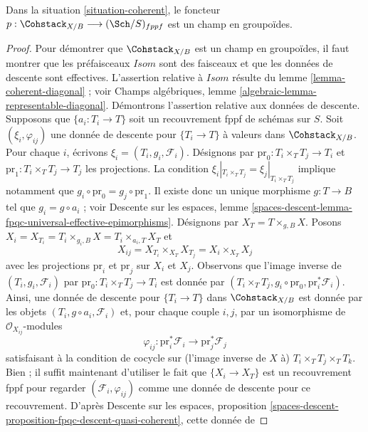 \begin{lemma}
\label{lemma-coherent-stack}
Dans la situation \ref{situation-coherent}, le foncteur
$p : \Cohstack_{X/B} \longrightarrow (\Sch/S)_{fppf}$ est un champ en
groupoïdes.
\end{lemma}

\begin{proof}
Pour démontrer que $\Cohstack_{X/B}$ est un champ en groupoïdes, il faut
montrer que les préfaisceaux $\mathit{Isom}$ sont des faisceaux et que les
données de descente sont effectives. L'assertion relative à $\mathit{Isom}$
résulte du lemme \ref{lemma-coherent-diagonal} ; voir Champs algébriques,
lemme \ref{algebraic-lemma-representable-diagonal}. Démontrons l'assertion
relative aux données de descente. Supposons que
$\{a_i : T_i \to T\}$ soit un recouvrement fppf de schémas sur $S$. Soit
$(\xi_i, \varphi_{ij})$ une donnée de descente pour $\{T_i \to T\}$ à valeurs
dans $\Cohstack_{X/B}$. Pour chaque $i$, écrivons
$\xi_i = (T_i, g_i, \mathcal{F}_i)$. Désignons par
$\text{pr}_0 : T_i \times_T T_j \to T_i$ et
$\text{pr}_1 : T_i \times_T T_j \to T_j$ les projections. La condition
$\xi_i|_{T_i \times_T T_j} = \xi_j|_{T_i \times_T T_j}$ implique notamment
que $g_i \circ \text{pr}_0 = g_j \circ \text{pr}_1$. Il existe donc un unique
morphisme $g : T \to B$ tel que $g_i = g \circ a_i$ ; voir Descente sur les
espaces, lemme
\ref{spaces-descent-lemma-fpqc-universal-effective-epimorphisms}.
Désignons par $X_T = T \times_{g, B} X$. Posons
$X_i = X_{T_i} = T_i \times_{g_i, B} X = T_i \times_{a_i, T} X_T$ et
$$
X_{ij} = X_{T_i} \times_{X_T} X_{T_j} = X_i \times_{X_T} X_j
$$
avec les projections $\text{pr}_i$ et $\text{pr}_j$ sur $X_i$ et $X_j$.
Observons que l'image inverse de $(T_i, g_i, \mathcal{F}_i)$ par
$\text{pr}_0 : T_i \times_T T_j \to T_i$ est donnée par
$(T_i \times_T T_j, g_i \circ \text{pr}_0, \text{pr}_i^*\mathcal{F}_i)$.
Ainsi, une donnée de descente pour $\{T_i \to T\}$ dans
$\Cohstack_{X/B}$ est donnée par les objets
$(T_i, g \circ a_i, \mathcal{F}_i)$ et, pour chaque couple $i, j$, par un
isomorphisme de $\mathcal{O}_{X_{ij}}$-modules
$$
\varphi_{ij} :
\text{pr}_i^*\mathcal{F}_i \longrightarrow \text{pr}_j^*\mathcal{F}_j
$$
satisfaisant à la condition de cocycle sur (l'image inverse de $X$ à)
$T_i \times_T T_j \times_T T_k$. Bien ; il suffit maintenant d'utiliser le
fait que $\{X_i \to X_T\}$ est un recouvrement fppf pour regarder
$(\mathcal{F}_i, \varphi_{ij})$ comme une donnée de descente pour ce
recouvrement. D'après Descente sur les espaces, proposition
\ref{spaces-descent-proposition-fpqc-descent-quasi-coherent}, cette donnée de

\end{proof}
